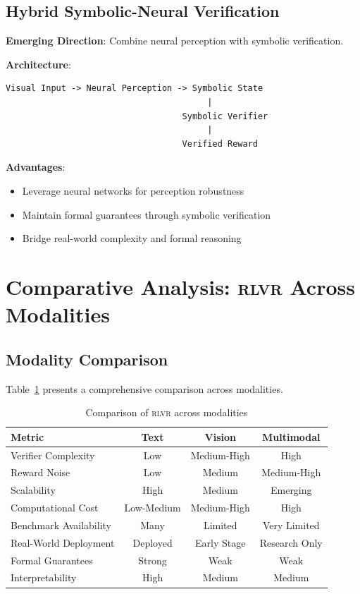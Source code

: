 \documentclass[11pt,a4paper]{article}
\newcommand{\rlvr}{\textsc{rlvr}}
\begin{document}
\subsection{Hybrid Symbolic-Neural Verification}
\label{sec:hybrid}

\textbf{Emerging Direction}: Combine neural perception with symbolic verification.

\textbf{Architecture}:
\begin{verbatim}
Visual Input -> Neural Perception -> Symbolic State
                                        |
                                   Symbolic Verifier
                                        |
                                   Verified Reward
\end{verbatim}

\textbf{Advantages}:
\begin{itemize}[leftmargin=*]
    \item Leverage neural networks for perception robustness
    \item Maintain formal guarantees through symbolic verification
    \item Bridge real-world complexity and formal reasoning
\end{itemize}

\section{Comparative Analysis: \rlvr{} Across Modalities}
\label{sec:comparison}

\subsection{Modality Comparison}
\label{sec:modality_comparison}

Table~\ref{tab:modality_comparison} presents a comprehensive comparison across modalities.

\begin{table}[t]
\centering
\caption{Comparison of \rlvr{} across modalities}
\label{tab:modality_comparison}
\small
\begin{tabular}{@{}lccc@{}}
\toprule
\textbf{Metric} & \textbf{Text} & \textbf{Vision} & \textbf{Multimodal} \\
\midrule
Verifier Complexity & Low & Medium-High & High \\
Reward Noise & Low & Medium & Medium-High \\
Scalability & High & Medium & Emerging \\
Computational Cost & Low-Medium & Medium-High & High \\
Benchmark Availability & Many & Limited & Very Limited \\
Real-World Deployment & Deployed & Early Stage & Research Only \\
Formal Guarantees & Strong & Weak & Weak \\
Interpretability & High & Medium & Medium \\
\bottomrule
\end{tabular}
\end{table}
\end{document}
